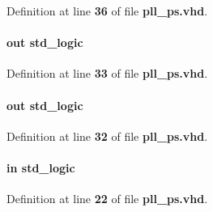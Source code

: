 Definition at line {\bf 36} of file {\bf pll\+\_\+ps.\+vhd}.

\paragraph[{pll\+\_\+phasestep}]{ {\bfseries \textcolor{keywordflow}{out}\textcolor{vhdlchar}{ }} {\bfseries \textcolor{comment}{std\+\_\+logic}\textcolor{vhdlchar}{ }} \hspace{0.3cm}{\ttfamily [Port]}}\label{classpll__ps_af550a195bbb22d65df1e586e3a125d40}


Definition at line {\bf 33} of file {\bf pll\+\_\+ps.\+vhd}.

\paragraph[{pll\+\_\+phaseupdown}]{ {\bfseries \textcolor{keywordflow}{out}\textcolor{vhdlchar}{ }} {\bfseries \textcolor{comment}{std\+\_\+logic}\textcolor{vhdlchar}{ }} \hspace{0.3cm}{\ttfamily [Port]}}\label{classpll__ps_a214826a04d6f05105456cd907573ef7d}


Definition at line {\bf 32} of file {\bf pll\+\_\+ps.\+vhd}.

\paragraph[{reset\+\_\+n}]{ {\bfseries \textcolor{keywordflow}{in}\textcolor{vhdlchar}{ }} {\bfseries \textcolor{comment}{std\+\_\+logic}\textcolor{vhdlchar}{ }} \hspace{0.3cm}{\ttfamily [Port]}}\label{classpll__ps_a446ea52ed8c4a84181a47d9165ce41a5}


Definition at line {\bf 22} of file {\bf pll\+\_\+ps.\+vhd}.

